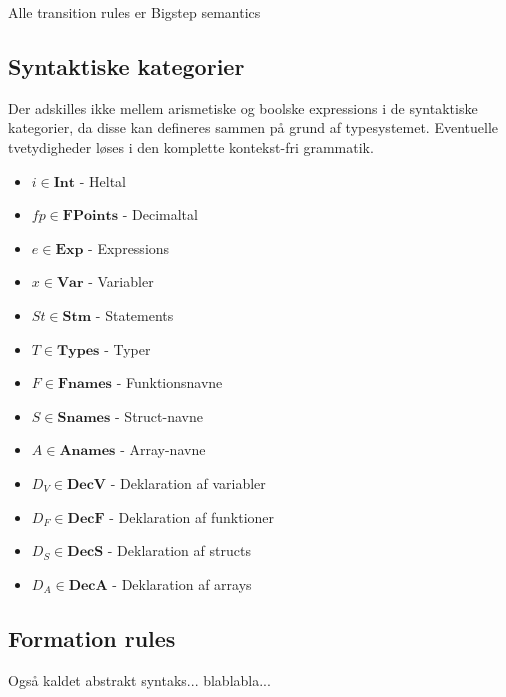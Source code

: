 \renewcommand{\syntleft}{\normalfont\itshape}
\renewcommand{\syntright}{$$}

Alle transition rules er Bigstep semantics

\subsection{Syntaktiske kategorier}

Der adskilles ikke mellem arismetiske og boolske expressions i de syntaktiske kategorier, da disse kan defineres sammen på grund af typesystemet. Eventuelle tvetydigheder løses i den komplette kontekst-fri grammatik.

\begin{itemize}
    \item $ i \in \textbf{Int} $ - Heltal
    \item $ fp \in \textbf{FPoints} $ - Decimaltal
    \item $ e \in \textbf{Exp} $ - Expressions
    \item $ x \in \textbf{Var} $ - Variabler
    \item $ St \in \textbf{Stm} $ - Statements
    \item $ T \in \textbf{Types} $ - Typer
    \item $ F \in \textbf{Fnames} $ - Funktionsnavne
    \item $ S \in \textbf{Snames} $ - Struct-navne
    \item $ A \in \textbf{Anames} $ - Array-navne
    \item $ D_V \in \textbf{DecV} $ - Deklaration af variabler
    \item $ D_F \in \textbf{DecF} $ - Deklaration af funktioner
    \item $ D_S \in \textbf{DecS} $ - Deklaration af structs
    \item $ D_A \in \textbf{DecA} $ - Deklaration af arrays
\end{itemize}


\subsection{Formation rules}
Også kaldet abstrakt syntaks... blablabla...

